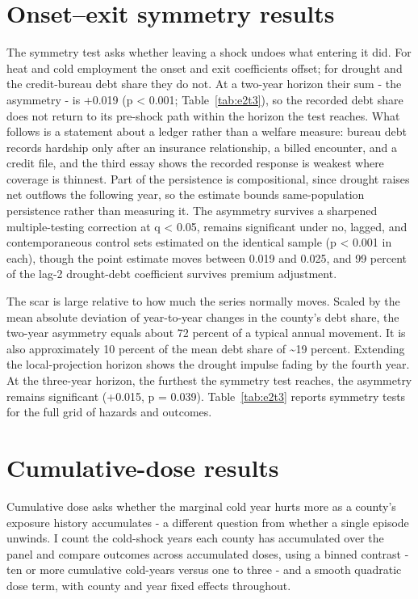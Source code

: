 \documentclass[a4paper,11pt]{article}
\begin{document}


\FloatBarrier
\section{Onset--exit symmetry results}

The symmetry test asks whether leaving a shock undoes what entering it did. For heat and cold employment the onset and exit coefficients offset; for drought and the credit-bureau debt share they do not. At a two-year horizon their sum - the asymmetry - is +0.019 (p < 0.001; Table~\ref{tab:e2t3}), so the recorded debt share does not return to its pre-shock path within the horizon the test reaches. What follows is a statement about a ledger rather than a welfare measure: bureau debt records hardship only after an insurance relationship, a billed encounter, and a credit file, and the third essay shows the recorded response is weakest where coverage is thinnest. Part of the persistence is compositional, since drought raises net outflows the following year, so the estimate bounds same-population persistence rather than measuring it. The asymmetry survives a sharpened multiple-testing correction at q < 0.05, remains significant under no, lagged, and contemporaneous control sets estimated on the identical sample (p < 0.001 in each), though the point estimate moves between 0.019 and 0.025, and 99 percent of the lag-2 drought-debt coefficient survives premium adjustment.

The scar is large relative to how much the series normally moves. Scaled by the mean absolute deviation of year-to-year changes in the county's debt share, the two-year asymmetry equals about 72 percent of a typical annual movement. It is also approximately 10 percent of the mean debt share of \textasciitilde{}19 percent. Extending the local-projection horizon shows the drought impulse fading by the fourth year. At the three-year horizon, the furthest the symmetry test reaches, the asymmetry remains significant (+0.015, p = 0.039). Table~\ref{tab:e2t3} reports symmetry tests for the full grid of hazards and outcomes.



\FloatBarrier
\section{Cumulative-dose results}

Cumulative dose asks whether the marginal cold year hurts more as a county's exposure history accumulates - a different question from whether a single episode unwinds. I count the cold-shock years each county has accumulated over the panel and compare outcomes across accumulated doses, using a binned contrast - ten or more cumulative cold-years versus one to three - and a smooth quadratic dose term, with county and year fixed effects throughout.
\end{document}
